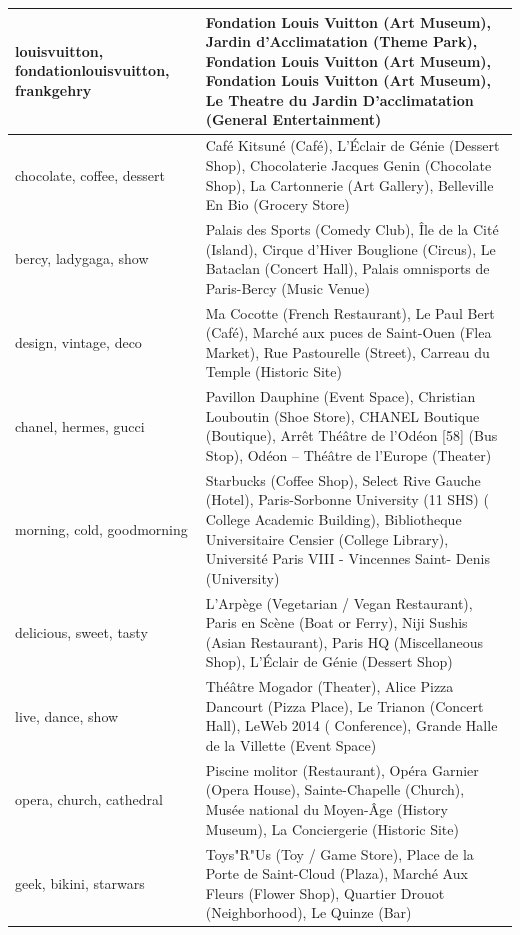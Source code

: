 \begin{longtable}{|p{2in}|p{3in}|}
  louisvuitton, fondationlouisvuitton, frankgehry & Fondation Louis Vuitton (Art Museum), Jardin d'Acclimatation (Theme Park),  Fondation Louis Vuitton (Art Museum), Fondation Louis Vuitton (Art Museum), Le Theatre du Jardin D'acclimatation (General  Entertainment) \\ \hline 
  chocolate, coffee, dessert & Café Kitsuné (Café), L'Éclair de Génie (Dessert Shop), Chocolaterie Jacques Genin (Chocolate   Shop), La Cartonnerie (Art Gallery), Belleville En Bio (Grocery Store) \\ \hline 
  bercy, ladygaga, show & Palais des Sports (Comedy Club), Île de la Cité (Island), Cirque d'Hiver Bouglione (Circus), Le   Bataclan (Concert Hall), Palais omnisports de Paris-Bercy (Music Venue) \\ \hline 
  design, vintage, deco & Ma Cocotte (French Restaurant), Le Paul Bert (Café), Marché aux puces de Saint-Ouen (Flea Market),  Rue Pastourelle (Street), Carreau du Temple (Historic Site) \\ \hline 
  chanel, hermes, gucci & Pavillon Dauphine (Event Space), Christian Louboutin (Shoe Store), CHANEL Boutique (Boutique), Arrêt  Théâtre de l'Odéon [58] (Bus Stop), Odéon – Théâtre de l'Europe (Theater) \\ \hline 
  morning, cold, goodmorning & Starbucks (Coffee Shop), Select Rive Gauche (Hotel), Paris-Sorbonne University (11 SHS) (  College Academic Building), Bibliotheque Universitaire Censier (College Library), Université Paris VIII - Vincennes Saint-  Denis (University) \\ \hline 
  delicious, sweet, tasty & L'Arpège (Vegetarian / Vegan Restaurant), Paris en Scène (Boat or Ferry), Niji Sushis (Asian  Restaurant), Paris HQ (Miscellaneous Shop), L'Éclair de Génie (Dessert Shop) \\ \hline 
  live, dance, show & Théâtre Mogador (Theater), Alice Pizza Dancourt (Pizza Place), Le Trianon (Concert Hall), LeWeb 2014 (  Conference), Grande Halle de la Villette (Event Space) \\ \hline 
  opera, church, cathedral & Piscine molitor (Restaurant), Opéra Garnier (Opera House), Sainte-Chapelle (Church), Musée   national du Moyen-Âge (History Museum), La Conciergerie (Historic Site) \\ \hline 
  geek, bikini, starwars & Toys"R"Us (Toy / Game Store), Place de la Porte de Saint-Cloud (Plaza), Marché Aux Fleurs (Flower  Shop), Quartier Drouot (Neighborhood), Le Quinze (Bar) \\ \hline 

  \hline
\end{longtable}

